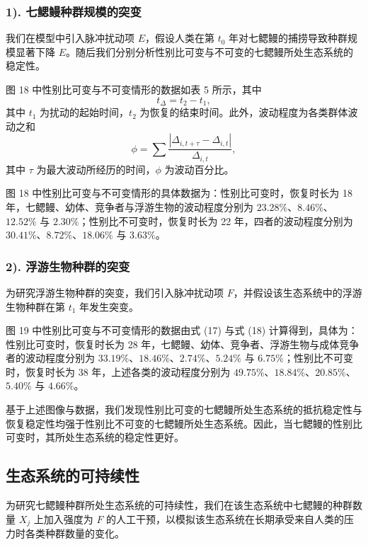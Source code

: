 \documentclass[11pt,a4paper]{ctexart}
\begin{document}
\subsubsection*{1). 七鳃鳗种群规模的突变}

我们在模型中引入脉冲扰动项 $E$，假设人类在第 $t_0$ 年对七鳃鳗的捕捞导致种群规模显著下降 $E$。随后我们分别分析性别比可变与不可变的七鳃鳗所处生态系统的稳定性。

图 18 中性别比可变与不可变情形的数据如表 5 所示，其中
\begin{equation}
t_{\Delta}=t_2-t_1,
\end{equation}
其中 $t_1$ 为扰动的起始时间，$t_2$ 为恢复的结束时间。此外，波动程度为各类群体波动之和
\begin{equation}
\phi=\sum\frac{|\Delta_{i,t+\tau}-\Delta_{i,t}|}{\Delta_{i,t}},
\end{equation}
其中 $\tau$ 为最大波动所经历的时间，$\phi$ 为波动百分比。

图 18 中性别比可变与不可变情形的具体数据为：性别比可变时，恢复时长为 18 年，七鳃鳗、幼体、竞争者与浮游生物的波动程度分别为 $23.28\%$、$8.46\%$、$12.52\%$ 与 $2.30\%$；性别比不可变时，恢复时长为 22 年，四者的波动程度分别为 $30.41\%$、$8.72\%$、$18.06\%$ 与 $3.63\%$。

\subsubsection*{2). 浮游生物种群的突变}

为研究浮游生物种群的突变，我们引入脉冲扰动项 $F$，并假设该生态系统中的浮游生物种群在第 $t_1$ 年发生突变。

图 19 中性别比可变与不可变情形的数据由式 (17) 与式 (18) 计算得到，具体为：性别比可变时，恢复时长为 28 年，七鳃鳗、幼体、竞争者、浮游生物与成体竞争者的波动程度分别为 $33.19\%$、$18.46\%$、$2.74\%$、$5.24\%$ 与 $6.75\%$；性别比不可变时，恢复时长为 38 年，上述各类的波动程度分别为 $49.75\%$、$18.84\%$、$20.85\%$、$5.40\%$ 与 $4.66\%$。

基于上述图像与数据，我们发现性别比可变的七鳃鳗所处生态系统的抵抗稳定性与恢复稳定性均强于性别比不可变的七鳃鳗所处生态系统。因此，当七鳃鳗的性别比可变时，其所处生态系统的稳定性更好。

\subsection{生态系统的可持续性}

为研究七鳃鳗种群所处生态系统的可持续性，我们在该生态系统中七鳃鳗的种群数量 $X_j$ 上加入强度为 $F$ 的人工干预，以模拟该生态系统在长期承受来自人类的压力时各类种群数量的变化。
\end{document}
